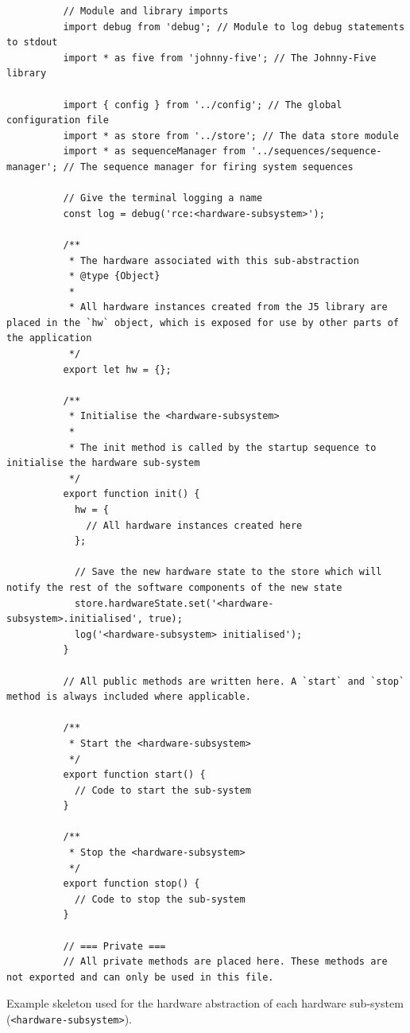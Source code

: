       \begin{code}
        \begin{verbatim}
          // Module and library imports
          import debug from 'debug'; // Module to log debug statements to stdout
          import * as five from 'johnny-five'; // The Johnny-Five library
          
          import { config } from '../config'; // The global configuration file
          import * as store from '../store'; // The data store module
          import * as sequenceManager from '../sequences/sequence-manager'; // The sequence manager for firing system sequences
          
          // Give the terminal logging a name
          const log = debug('rce:<hardware-subsystem>');
          
          /**
           * The hardware associated with this sub-abstraction
           * @type {Object}
           *
           * All hardware instances created from the J5 library are placed in the `hw` object, which is exposed for use by other parts of the application
           */
          export let hw = {};
          
          /**
           * Initialise the <hardware-subsystem>
           *
           * The init method is called by the startup sequence to initialise the hardware sub-system
           */
          export function init() {         
            hw = {
              // All hardware instances created here
            };
            
            // Save the new hardware state to the store which will notify the rest of the software components of the new state
            store.hardwareState.set('<hardware-subsystem>.initialised', true);
            log('<hardware-subsystem> initialised');
          }
          
          // All public methods are written here. A `start` and `stop` method is always included where applicable.
          
          /**
           * Start the <hardware-subsystem>
           */
          export function start() {
            // Code to start the sub-system
          }
          
          /**
           * Stop the <hardware-subsystem>
           */
          export function stop() {
            // Code to stop the sub-system
          }
          
          // === Private ===
          // All private methods are placed here. These methods are not exported and can only be used in this file.
        \end{verbatim}
        \caption{Example skeleton used for the hardware abstraction of each hardware sub-system (\texttt{<hardware-subsystem>}).}
        \label{code:exampleHwAbstractionSkeleton}
      \end{code}
      
